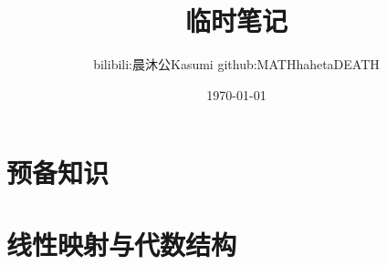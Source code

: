 \documentclass{plainbook}
\title{临时笔记}
\author{bilibili:晨沐公Kasumi \quad github:MATHhahetaDEATH}
\date{\today}
\begin{document}
\frontmatter



\maketitle\pagebreak

% 





% 

% 

\tableofcontents

\mainmatter


\part{预备知识}










\part{线性映射与代数结构}






\end{document}

